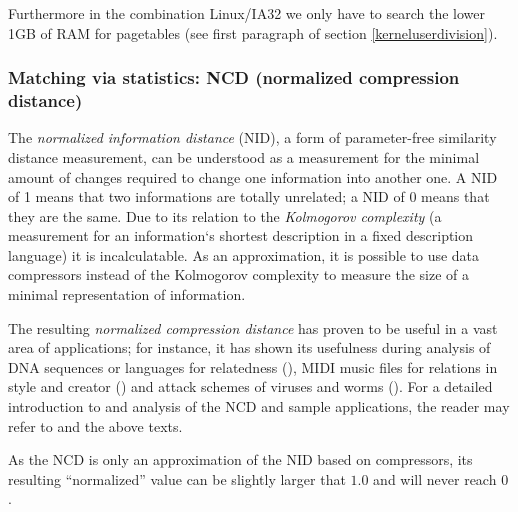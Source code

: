 Furthermore in the combination Linux/IA32 we only have to search the lower 1GB
of RAM for pagetables (see first paragraph of section \ref{kerneluserdivision}).



\subsubsection{Matching via statistics: NCD (normalized compression distance)}

\label{ATTstatistics} The \emph{normalized information distance} (NID), a form
of parameter-free similarity distance measurement, can be understood as a
measurement for the minimal amount of changes required to change one information
into another one.  A NID of 1 means that two informations are totally unrelated;
a NID of 0 means that they are the same.  Due to its relation to the
\emph{Kolmogorov complexity} (a measurement for an information`s shortest
description in a fixed description language) it is incalculatable.  As an
approximation, it is possible to use data compressors instead of the Kolmogorov
complexity to measure the size of a minimal representation of information.

%

The resulting \emph{normalized compression distance} has proven to be useful in
a vast area of applications; for instance, it has shown its usefulness during
analysis of DNA sequences or languages for relatedness
(\cite{clustering_by_compression:2005,similarity_matrix:2004}), MIDI music files
for relations in style and creator (\cite{clustering_by_compression:2005}) and
attack schemes of viruses and worms (\cite{analysing_worms_with_ncd:2006}).  For
a detailed introduction to and analysis of the NCD and sample applications, the
reader may refer to \cite{kolmogorov:1997} and the above texts.

As the NCD is only an approximation of the NID based on compressors, its
resulting ``normalized'' value can be slightly larger that $1.0$ and will never
reach $0$.

